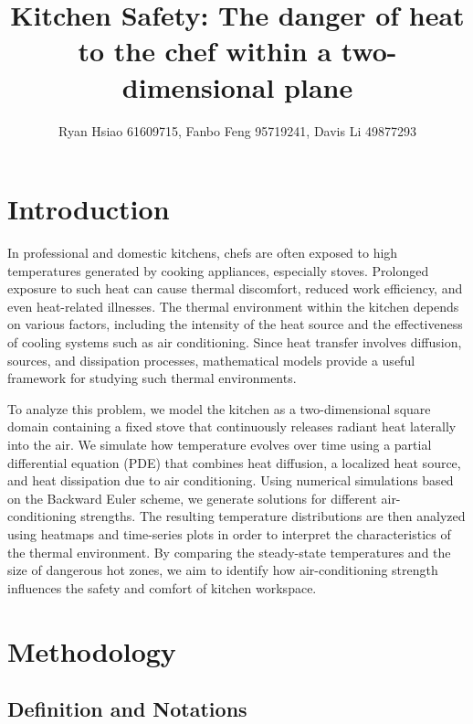 \documentclass{article}
\title{Kitchen Safety: The danger of heat to the chef within a two-dimensional plane}
\author{Ryan Hsiao 61609715, Fanbo Feng 95719241, Davis Li 49877293}
\date{}  %
\begin{document}
\maketitle

\section{Introduction}
In professional and domestic kitchens, chefs are often exposed to high temperatures generated by cooking appliances, especially stoves. Prolonged exposure to such heat can cause thermal discomfort, reduced work efficiency, and even heat-related illnesses. The thermal environment within the kitchen depends on various factors, including the intensity of the heat source and the effectiveness of cooling systems such as air conditioning. Since heat transfer involves diffusion, sources, and dissipation processes, mathematical models provide a useful framework for studying such thermal environments.

\vspace{3mm}

\noindent To analyze this problem, we model the kitchen as a two-dimensional square domain containing a fixed stove that continuously releases radiant heat laterally into the air. We simulate how temperature evolves over time using a partial differential equation (PDE) that combines heat diffusion, a localized heat source, and heat dissipation due to air conditioning. Using numerical simulations based on the Backward Euler scheme, we generate solutions for different air-conditioning strengths. The resulting temperature distributions are then analyzed using heatmaps and time-series plots in order to interpret the characteristics of the thermal environment. By comparing the steady-state temperatures and the size of dangerous hot zones, we aim to identify how air-conditioning strength influences the safety and comfort of kitchen workspace.
\section{Methodology}\label{sec:model}

\subsection{Definition and Notations}
\end{document}
